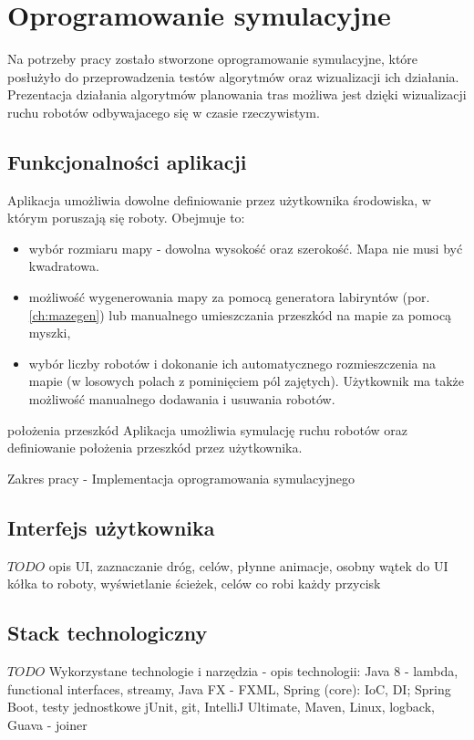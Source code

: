 \chapter{Oprogramowanie symulacyjne}
\label{ch:simulation-app}

Na potrzeby pracy zostało stworzone oprogramowanie symulacyjne, które posłużyło do przeprowadzenia testów algorytmów oraz wizualizacji ich działania.
Prezentacja działania algorytmów planowania tras możliwa jest dzięki wizualizacji ruchu robotów odbywajacego się w czasie rzeczywistym. 

\section{Funkcjonalności aplikacji}

Aplikacja umożliwia dowolne definiowanie przez użytkownika środowiska, w którym poruszają się roboty. Obejmuje to:
\begin{itemize}
	\item wybór rozmiaru mapy - dowolna wysokość oraz szerokość. Mapa nie musi być kwadratowa.
	\item możliwość wygenerowania mapy za pomocą generatora labiryntów (por. \ref{ch:mazegen}) lub manualnego umieszczania przeszkód na mapie za pomocą myszki,
	\item wybór liczby robotów i dokonanie ich automatycznego rozmieszczenia na mapie (w losowych polach z pominięciem pól zajętych). Użytkownik ma także możliwość manualnego dodawania i usuwania robotów.
\end{itemize}
położenia przeszkód 
Aplikacja umożliwia symulację ruchu robotów oraz definiowanie położenia przeszkód przez użytkownika.

Zakres pracy - Implementacja oprogramowania symulacyjnego


\section{Interfejs użytkownika}
$TODO$ opis UI, zaznaczanie dróg, celów, płynne animacje, osobny wątek do UI
kółka to roboty, wyświetlanie ścieżek, celów
co robi każdy przycisk

\section{Stack technologiczny}
$TODO$ Wykorzystane technologie i narzędzia - opis technologii:
Java 8 - lambda, functional interfaces, streamy,
Java FX - FXML, Spring (core): IoC, DI; Spring Boot, testy jednostkowe jUnit, git, IntelliJ Ultimate, Maven, Linux, logback, Guava - joiner

